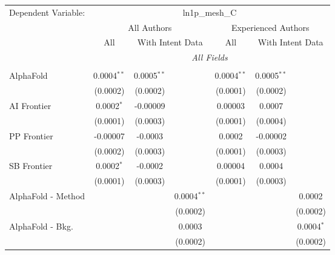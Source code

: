 \begingroup
\centering
\begin{tabular}{lcccccc}
   \tabularnewline \midrule \midrule
   Dependent Variable: & \multicolumn{6}{c}{ln1p\_mesh\_C}\\
 & \multicolumn{3}{c}{All Authors} & \multicolumn{3}{c}{Experienced Authors} \\
\cmidrule(lr){2-4} \cmidrule(lr){5-7}
 & \multicolumn{1}{c}{All} & \multicolumn{2}{c}{With Intent Data} & \multicolumn{1}{c}{All} & \multicolumn{2}{c}{With Intent Data} \\
\cmidrule(lr){2-2} \cmidrule(lr){3-4} \cmidrule(lr){5-5} \cmidrule(lr){6-7}
 & \multicolumn{6}{c}{\textit{All Fields}} \\ \\
   AlphaFold            & 0.0004$^{**}$ & 0.0005$^{**}$ &                 & 0.0004$^{**}$ & 0.0005$^{**}$ &   \\   
                        & (0.0002)      & (0.0002)      &                 & (0.0001)      & (0.0002)      &   \\   
   AI Frontier          & 0.0002$^{*}$  & -0.00009      &                 & 0.00003       & 0.0007        &   \\   
                        & (0.0001)      & (0.0003)      &                 & (0.0001)      & (0.0004)      &   \\   
   PP Frontier          & -0.00007      & -0.0003       &                 & 0.0002        & -0.00002      &   \\   
                        & (0.0002)      & (0.0003)      &                 & (0.0001)      & (0.0003)      &   \\   
   SB Frontier          & 0.0002$^{*}$  & -0.0002       &                 & 0.00004       & 0.0004        &   \\   
                        & (0.0001)      & (0.0003)      &                 & (0.0001)      & (0.0003)      &   \\   
   AlphaFold - Method   &               &               & 0.0004$^{**}$   &               &               & 0.0002\\   
                        &               &               & (0.0002)        &               &               & (0.0002)\\   
   AlphaFold - Bkg.     &               &               & 0.0003          &               &               & 0.0004$^{*}$\\   
                        &               &               & (0.0002)        &               &               & (0.0002)\\   

\end{tabular}
